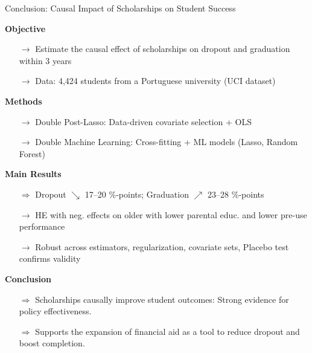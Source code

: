 \documentclass[aspectratio=169]{beamer}
\begin{document}
\begin{frame}{Conclusion: Causal Impact of Scholarships on Student Success}
	
	\textbf{Objective} 
	\vspace{-5pt}
	\begin{itemize}
	\item[$\rightarrow$]Estimate the causal effect of scholarships on dropout and graduation within 3 years 
	\item[$\rightarrow$]Data: 4,424 students from a Portuguese university (UCI dataset) 
	\end{itemize}
	\vspace{-5pt}
	
	\textbf{Methods}
	\vspace{-5pt}
	\begin{itemize}
	\item[$\rightarrow$]Double Post-Lasso: Data-driven covariate selection + OLS
	\item[$\rightarrow$]Double Machine Learning: Cross-fitting + ML models (Lasso, Random Forest)
	\end{itemize}
	\vspace{-5pt}
	
	\textbf{Main Results}
	\vspace{-5pt}
	\begin{itemize}
	\item[$\Rightarrow$]Dropout $\searrow$ 17–20 \%-points; Graduation $\nearrow$ 23–28 \%-points
	\item[$\rightarrow$]HE with neg. effects on older with lower parental educ. and lower pre-use performance
	\item[$\rightarrow$]Robust across estimators, regularization, covariate sets, Placebo test confirms validity
	\end{itemize}
	\vspace{-5pt}

	\textbf{Conclusion}
	\vspace{-5pt}
	\begin{itemize}
	\item[$\Rightarrow$]Scholarships causally improve student outcomes: Strong evidence for policy effectiveness.
	\item[$\Rightarrow$]Supports the expansion of financial aid as a tool to reduce dropout and boost completion.
	\end{itemize}
	
\end{frame}

\appendix
\end{document}
